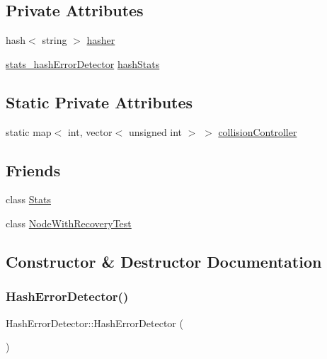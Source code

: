 \subsection*{Private Attributes}
\begin{DoxyCompactItemize}
\item 
hash$<$ string $>$ \hyperlink{classHashErrorDetector_a5193286d834f087e03b7299e81b60509}{hasher}
\item 
\hyperlink{HashErrorDetector_8h_afcf148bcfe372c25deda29220815b9e0}{stats\+\_\+hash\+Error\+Detector} \hyperlink{classHashErrorDetector_aec82c653679515b306b34eb075cf37fd}{hash\+Stats}
\end{DoxyCompactItemize}
\subsection*{Static Private Attributes}
\begin{DoxyCompactItemize}
\item 
static map$<$ int, vector$<$ unsigned int $>$ $>$ \hyperlink{classHashErrorDetector_a662a2baf62e11d8e2468aee44b9b168e}{collision\+Controller}
\end{DoxyCompactItemize}
\subsection*{Friends}
\begin{DoxyCompactItemize}
\item 
class \hyperlink{classHashErrorDetector_a129f65b6976377739eb6231b6962985e}{Stats}
\item 
class \hyperlink{classHashErrorDetector_a4a759c82473f06c7e89c3d75a509a390}{Node\+With\+Recovery\+Test}
\end{DoxyCompactItemize}


\subsection{Constructor \& Destructor Documentation}
\mbox{\label{classHashErrorDetector_a008bd7bd3f8d202334afd51a71cbbdae}} 
\subsubsection{\texorpdfstring{Hash\+Error\+Detector()}{HashErrorDetector()}}
{\footnotesize\ttfamily Hash\+Error\+Detector\+::\+Hash\+Error\+Detector (\begin{DoxyParamCaption}{ }\end{DoxyParamCaption})}

